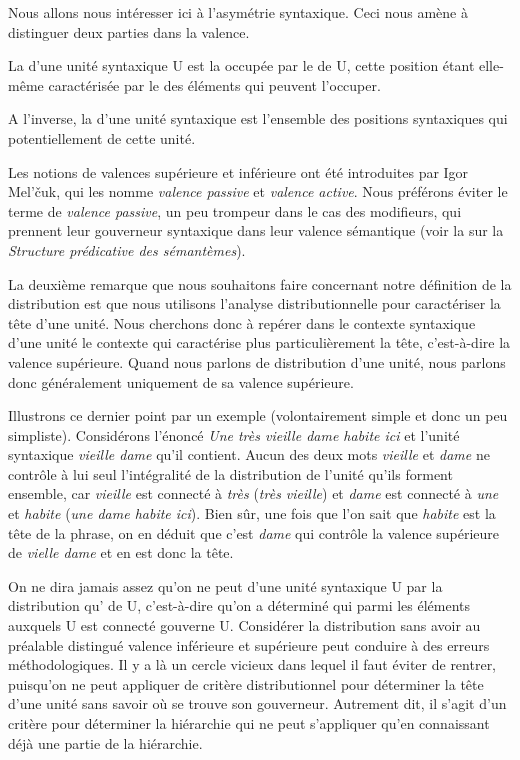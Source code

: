 Nous allons nous intéresser ici à l’asymétrie syntaxique. Ceci nous amène à distinguer deux parties dans la valence.

{La  d’une unité syntaxique U est la  occupée par le  de U, cette position étant elle-même caractérisée par le  des éléments qui peuvent l’occuper.}

{A l’inverse, la  d’une unité syntaxique est l’ensemble des positions syntaxiques qui  potentiellement de cette unité.}

Les notions de valences supérieure et inférieure ont été introduites par Igor Mel’čuk, qui les nomme \textit{valence passive} et \textit{valence active}. Nous préférons éviter le terme de \textit{valence passive}, un peu trompeur dans le cas des modifieurs, qui prennent leur gouverneur syntaxique dans leur valence sémantique (voir la  sur la \textit{Structure prédicative des sémantèmes}).

La deuxième remarque que nous souhaitons faire concernant notre définition de la distribution est que nous utilisons l’analyse distributionnelle pour caractériser la tête d’une unité. Nous cherchons donc à repérer dans le contexte syntaxique d’une unité le contexte qui caractérise plus particulièrement la tête, c’est-à-dire la valence supérieure. Quand nous parlons de distribution d'une unité, nous parlons donc généralement uniquement de sa valence supérieure.

Illustrons ce dernier point par un exemple (volontairement simple et donc un peu simpliste). Considérons l’énoncé \textit{Une très vieille dame habite ici} et l’unité syntaxique \textit{vieille dame} qu’il contient. Aucun des deux mots \textit{vieille} et \textit{dame} ne contrôle à lui seul l’intégralité de la distribution de l’unité qu’ils forment ensemble, car \textit{vieille} est connecté à \textit{très} (\textit{très vieille}) et \textit{dame} est connecté à \textit{une} et \textit{habite} (\textit{une dame habite ici}). Bien sûr, une fois que l’on sait que \textit{habite} est la tête de la phrase, on en déduit que c'est \textit{dame} qui contrôle la valence supérieure de \textit{vielle dame} et en est donc la tête.

On ne dira jamais assez qu’on ne peut  d’une unité syntaxique U par la distribution qu’  de U, c’est-à-dire qu’on a déterminé qui parmi les éléments auxquels U est connecté gouverne U. Considérer la distribution sans avoir au préalable distingué valence inférieure et supérieure peut conduire à des erreurs méthodologiques. Il y a là un cercle vicieux dans lequel il faut éviter de rentrer, puisqu’on ne peut appliquer de critère distributionnel pour déterminer la tête d’une unité sans savoir où se trouve son gouverneur. Autrement dit, il s’agit d’un critère pour déterminer la hiérarchie qui ne peut s’appliquer qu'en connaissant déjà une partie de la hiérarchie.

